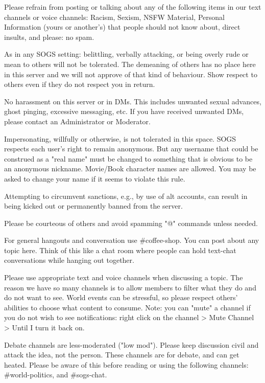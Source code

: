 \begin{longenum}[ label*=\thesubsection.\arabic*., align=left]
\begin{longenum}[label*=\arabic*., align=left]
			\item Please refrain from posting or talking about any of the following items in our text channels or voice channels: Racism, Sexism, NSFW Material, Personal Information (yours or another's) that people should not know about, direct insults, and please: no spam.
			\item As in any SOGS setting: belittling, verbally attacking, or being overly rude or mean to others will not be tolerated. The demeaning of others has no place here in this server and we will not approve of that kind of behaviour. Show respect to others even if they do not respect you in return.
			\item No harassment on this server or in DMs. This includes unwanted sexual advances, ghost pinging, excessive messaging, etc. If you have received unwanted DMs, please contact an Administrator or Moderator.
			\item Impersonating, willfully or otherwise, is not tolerated in this space. SOGS respects each user's right to remain anonymous. But any username that could be construed as a "real name" must be changed to something that is obvious to be an anonymous nickname. Movie/Book character names are allowed. You may be asked to change your name if it seems to violate this rule.
			\item Attempting to circumvent sanctions, e.g., by use of alt accounts, can result in being kicked out or permanently banned from the server.
			\item Please be courteous of others and avoid spamming "@" commands unless needed.
			\item For general hangouts and conversation use \#coffee-shop. You can post about any topic here. Think of this like a chat room where people can hold text-chat conversations while hanging out together.
			\item Please use appropriate text and voice channels when discussing a topic. The reason we have so many channels is to allow members to filter what they do and do not want to see. World events can be stressful, so please respect others' abilities to choose what content to consume. Note: you can "mute" a channel if you do not wish to see notifications: right click on the channel > Mute Channel > Until I turn it back on.
			\item Debate channels are less-moderated ("low mod"). Please keep discussion civil and attack the idea, not the person. These channels are for debate, and can get heated. Please be aware of this before reading or using the following channels: \#world-politics, and \#sogs-chat.

\end{longenum}
\end{longenum}
